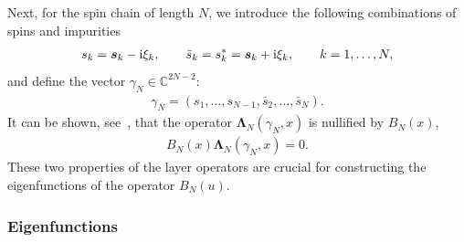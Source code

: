 \documentclass[pdftex]{sigma}%
\numberwithin{equation}{section}
\begin{document}
Next, for the spin chain of length $N$, we introduce the following combinations of spins and impurities
\begin{gather*}
s_k=\boldsymbol s_k - {\rm i}\xi_k, \qquad
\bar s_k=s_k^*=\boldsymbol s_k + {\rm i}\xi_k, \qquad
k=1,\dots,N,
\end{gather*}
and define the vector $\gamma_N\in\mathbb C^{2N-2}$:
 \begin{gather}\label{definition:gammaN}
\gamma_N=(s_1,\dots, s_{N-1},\bar s_2,\dots, \bar s_N).
\end{gather}
It can be shown, see~\cite{Derkachov:2002tf}, that the operator $\boldsymbol\Lambda_{N}(\gamma_N,x)$ is nullified by $B_N(x)$,
\begin{gather}\label{BLambda=0}
B_N(x)\boldsymbol\Lambda_{N}(\gamma_N,x)=0.
\end{gather}
These two properties of the layer operators are crucial for constructing the eigenfunctions of the operator $B_N(u)$.


\subsubsection{Eigenfunctions}\label{sect:B-eigenfunctions}
\end{document}
